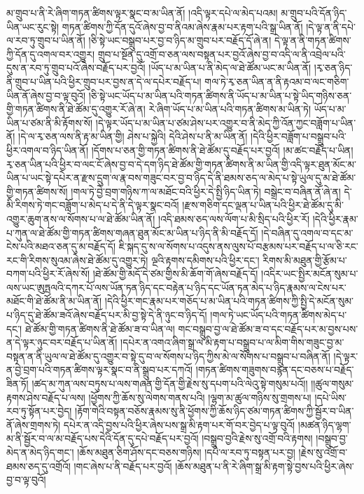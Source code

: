 མ་གྲུབ་པ་ནི་རེ་ཞིག་གཏན་ཚིགས་ལྟར་སྣང་བ་མ་ཡིན་ནོ། །འདི་ལྟར་དཔེ་ལ་མེད་པའམ། མ་གྲུབ་པའི་དོན་ཉིད་ཡིན་ཡང་རུང་སྟེ། གཏན་ཚིགས་ཀྱི་དོན་དུའོ་ཞེས་བྱ་བ་ནིའམ་ཞེས་རྣམ་པར་རྟག་པའི་སྒྲ་ཡིན་ནོ། །དེ་ལྟ་ན་ནི་དཔེ་ལ་རབ་ཏུ་གྲུབ་པ་ཡིན་ནོ། །ཅི་སྟེ་ཡང་བསྒྲུབ་པར་བྱ་བ་ཉིད་མ་གྲུབ་པར་བརྗོད་དོ་ཞེ་ན། དེ་ལྟ་ན་ནི་གཏན་ཚིགས་ཀྱི་དོན་དུ་འགལ་བར་འགྱུར། གྲུབ་པ་སྔོན་དུ་འགྲོ་བ་ཅན་ལས་བསྟན་པར་བྱའོ་ཞེས་བྱ་བ་འདི་ལ་ནི་འབྲེལ་པའི་དུས་ན་རབ་ཏུ་གྲུབ་པའོ་ཞེས་བརྗོད་པར་བྱའོ། །ཡོད་པ་མ་ཡིན་པ་ནི་མེད་ལ་ཐེ་ཚོམ་ཡང་མ་ཡིན་ནོ། །རྭ་ཅན་ཉིད་ནི་གྲུབ་པ་ཡིན་པའི་ཕྱིར་གྲུབ་པར་བྱས་ན་དེ་ལ་དཔེར་བརྗོད་པ། གལ་ཏེ་རྭ་ཅན་ཡིན་ན་ནི་རྟའམ་བ་ལང་གཅིག་ཡིན་ནོ་ཞེས་བྱ་བ་ལྟ་བུའོ། །ཅི་སྟེ་ཡང་ཡོད་པ་མ་ཡིན་པའི་གཏན་ཚིགས་ནི་ཡོད་པ་མ་ཡིན་པ་སྟེ་ཡིད་གཉིས་ཅན་གྱི་གཏན་ཚིགས་ནི་ཐེ་ཚོམ་དུ་འགྱུར་རོ་ཞེ་ན། རེ་ཞིག་ཡོད་པ་མ་ཡིན་པའི་གཏན་ཚིགས་མ་ཡིན་ཏེ། ཡོད་པ་མ་ཡིན་པ་ཙམ་ནི་མི་རྟོགས་སོ། །དེ་ལྟར་ཡོད་པ་མ་ཡིན་པ་ཙམ་ཤེས་པར་འགྱུར་བ་ནི་མེད་ཀྱི་འོན་ཀྱང་བཟློག་པ་ཡིན་ནོ། །དེ་ལ་རྭ་ཅན་ལས་ནི་རྟ་མ་ཡིན་གྱི། ཤེས་པ་སྐྱེའི། དེའི་ཤེས་པ་ནི་མ་ཡིན་ནོ། །དེའི་ཕྱིར་བཟློག་པ་བསྒྲུབ་པའི་ཕྱིར་འགལ་བ་ཉིད་ཡིན་ནོ། །དོགས་པ་ཅན་གྱི་གཏན་ཚིགས་ནི་ཐེ་ཚོམ་དུ་བརྗོད་པར་བྱའོ། །མ་ཚང་བརྗོད་པ་ཡིན། རྭ་ཅན་ཡིན་པའི་ཕྱིར་བ་ལང་ངོ་ཞེས་བྱ་བ་དེ་དག་ཉིད་ཐེ་ཚོམ་གྱི་གཏན་ཚིགས་ནི་མ་ཡིན་གྱི་འདི་ལྟར་ཐུན་མོང་མ་ཡིན་པ་ཡང་སྟེ་དཔེར་ན་རྫས་དྲུག་ལ་རྣ་བས་གཟུང་བར་བྱ་བ་ཉིད་དེ་ནི་ཐམས་ཅད་ལ་མེད་པ་སྟེ་ཡུལ་དུ་མ་ཐེ་ཚོམ་གྱི་གཏན་ཚིགས་སོ། །གལ་ཏེ་བྱེ་བྲག་གཉིས་ཀ་ལ་མཐོང་བའི་ཕྱིར་དེ་སྤྱི་ཉིད་ཡིན་ཏེ། བསྒྲེང་བ་བཞིན་ནོ་ཞེ་ན། དེ་མི་རིགས་ཏེ་གང་བཟློག་པ་མེད་པ་དེ་ནི་དེ་ལྟར་སྣང་བའོ། །རྫས་གཅིག་དང་ལྡན་པ་ཡིན་པའི་ཕྱིར་ཐེ་ཚོམ་དུ་མི་འགྱུར་ཆུག་ནས་ལ་སོགས་པ་ལ་ཐེ་ཚོམ་ཡིན་ནོ། །འདི་ཐམས་ཅད་ལས་ལོག་པ་མི་སྲིད་པའི་ཕྱིར་རོ། །དེའི་ཕྱིར་རྣམ་པ་ཀུན་ལ་ཐེ་ཚོམ་གྱི་གཏན་ཚིགས་གཞན་ཐུན་མོང་མ་ཡིན་པ་ཉིད་ནི་མི་བརྗོད་དོ། །དེ་བཞིན་དུ་འགལ་བ་དང་མ་ངེས་པའི་མཐའ་ཅན་དུ་མ་བརྗོད་དོ། ཇི་སྐད་དུ་ས་ལ་སོགས་པ་འདུས་ནས་ལུས་པོ་བརྩམས་པར་བརྗོད་པ་ལ་ཅི་རང་རང་གི་རིགས་སུའམ་ཞེས་ཐེ་ཚོམ་དུ་འགྱུར་ཏེ། ལྔའི་རྟགས་དམིགས་པའི་ཕྱིར་དང་། རིགས་མི་མཐུན་གྱི་རྩོམ་པ་བཀག་པའི་ཕྱིར་རོ་ཞེས་སོ། །ཐེ་ཚོམ་གྱི་མདོ་དེ་ཙམ་གྱིས་མི་ཆོག་གོ་ཞེས་བརྗོད་དོ། །འདིར་ཡང་སྤྱིར་མངོན་སུམ་པ་ལས་ཡང་ཨུཏྤལའི་དཀར་པོ་ལས་ཡོན་ཏན་ཉིད་དང་བརྟེན་པ་ཉིད་དང་ཡོན་ཏན་མེད་པ་ཉིད་རྣམས་ལ་ངེས་པར་མཐོང་གི་ཐེ་ཚོམ་ནི་མ་ཡིན་ནོ། །དེའི་ཕྱིར་གང་རྣམ་པར་གཅོད་པ་མ་ཡིན་པའི་གཏན་ཚིགས་ཀྱི་སྤྱི་དེ་མངོན་སུམ་པ་ཉིད་དུ་ཐེ་ཚོམ་ཟའོ་ཞེས་བརྗོད་པར་མི་བྱ་སྟེ་དེ་ནི་ཉུང་བ་ཉིད་དོ། །གལ་ཏེ་ཡང་ཡོད་པའི་གཏན་ཚིགས་མེད་པ་དང་། ཐེ་ཚོམ་གྱི་གཏན་ཚིགས་ནི་ཐེ་ཚོམ་ཟ་བ་ཡིན་ལ། གང་བསྒྲུབ་བྱ་ལ་ཐེ་ཚོམ་ཟ་བ་དང་བརྗོད་པར་མ་བྱས་པས་ན་དེ་ལྟར་ཉུང་བར་བརྗོད་པ་ཡིན་ནོ། །དཔེར་ན་འགའ་ཞིག་སྒྲ་ལ་མི་རྟག་པ་བསྒྲུབ་པ་ལ་མིག་གིས་གཟུང་བྱ་མ་བསྟན་ན་ནི་ཡུལ་ལ་ཐེ་ཚོམ་དུ་འགྱུར་བ་སྟེ་དུ་བ་ལ་སོགས་པ་ཉིད་ཀྱིས་མེ་ལ་སོགས་པ་བསྒྲུབ་པ་བཞིན་ནོ། །དེ་ལྟར་ན་བྱེ་བྲག་པའི་གཏན་ཚིགས་ལྟར་སྣང་བ་ནི་སྒྲུབ་པར་དཀའོ། །གཏན་ཚིགས་གཟུགས་བརྙན་དང་བཅས་པ་བརྗོད་ཟིན་ཏོ། །ཚད་མ་ཀུན་ལས་བཏུས་པ་ལས་གཞན་གྱི་དོན་གྱི་རྗེས་སུ་དཔག་པའི་ལེའུ་སྟེ་གསུམ་པའོ།། །།ཚུལ་གསུམ་རྟགས་ཤེས་བརྗོད་པ་ལས། །ཕྱོགས་ཀྱི་ཆོས་སུ་ལེགས་གནས་པའི། །ལྷག་མ་ཚུལ་གཉིས་སུ་གྲགས་པ། །དཔེ་ཡིས་རབ་ཏུ་སྟོན་པར་བྱེད། །རྟོག་གེའི་བསྟན་བཅོས་རྣམས་སུ་ནི་ཕྱོགས་ཀྱི་ཆོས་ཉིད་ཙམ་གཏན་ཚིགས་ཀྱི་སྦྱོར་བ་ཡིན་ནོ་ཞེས་གྲགས་ཏེ། དཔེར་ན་འདི་བྱས་པའི་ཕྱིར་ཞེས་པས་སྒྲ་མི་རྟག་པར་གོ་བར་བྱེད་པ་ལྟ་བུའོ། །མཚན་ཉིད་ལྷག་མ་ནི་སྦྱོར་བ་ལ་མ་བརྗོད་པས་དེའི་དོན་དུ་དཔེ་བརྗོད་པར་བྱའོ། །བསྒྲུབ་བྱའི་རྗེས་སུ་འགྲོ་བའི་རྟགས། །བསྒྲུབ་བྱ་མེད་ན་མེད་ཉིད་གང་། །ཆོས་མཐུན་ཅིག་ཤོས་དང་བཅས་གཉིས། །དཔེ་ལ་རབ་ཏུ་བསྟན་པར་བྱ། །རྗེས་སུ་འགྲོ་བ་ཐམས་ཅད་དུ་འགྲོའོ། །གང་ཞེས་པ་ནི་བརྗོད་པར་བྱའོ། །ཆོས་མཐུན་པ་ནི་རེ་ཞིག་སྒྲ་མི་རྟག་སྟེ་བྱས་པའི་ཕྱིར་ཞེས་བྱ་བ་ལྟ་བུའོ། 